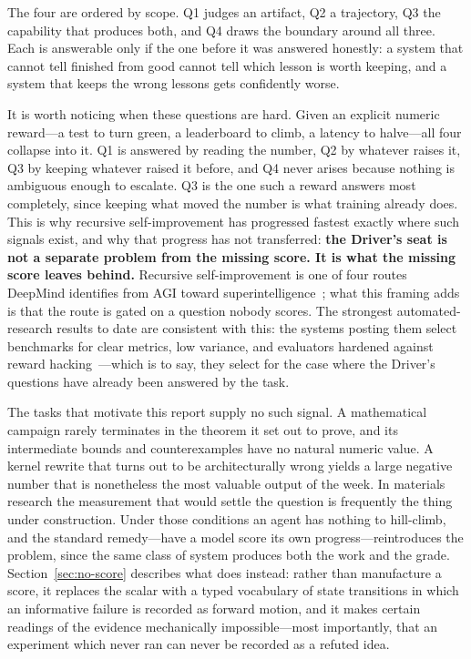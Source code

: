 The four are ordered by scope. Q1 judges an artifact, Q2 a trajectory, Q3 the
capability that produces both, and Q4 draws the boundary around all three. Each is
answerable only if the one before it was answered honestly: a system that cannot tell
finished from good cannot tell which lesson is worth keeping, and a system that keeps
the wrong lessons gets confidently worse.

It is worth noticing when these questions are hard. Given an explicit numeric
reward---a test to
turn green, a leaderboard to climb, a latency to halve---all four collapse into it.
Q1 is answered by reading the number, Q2 by whatever raises it, Q3 by keeping
whatever raised it before, and Q4 never arises because nothing is ambiguous enough to
escalate. Q3 is the one such a reward answers most completely, since keeping what
moved the number is what training already does. This is why recursive self-improvement has
progressed fastest exactly where such signals exist, and why that progress has not
transferred: \textbf{the Driver's seat is not a separate problem from the missing
score. It is what the missing score leaves behind.} Recursive self-improvement is one
of four routes DeepMind identifies from AGI toward
superintelligence~\citep{legg2026agitoasi}; what this framing adds is that the route
is gated on a question nobody scores. The strongest automated-research results to date
are consistent with this: the systems posting them select benchmarks for clear metrics,
low variance, and evaluators hardened against reward
hacking~\citep{recursive2026firststeps}---which is to say, they select for the case
where the Driver's questions have already been answered by the task.

The tasks that motivate this report supply no such signal. A mathematical campaign
rarely terminates in the theorem it set out to prove, and its intermediate bounds and
counterexamples have no natural numeric value. A kernel rewrite that turns out to be
architecturally wrong yields a large negative number that is nonetheless the most
valuable output of the week. In materials research the measurement that would settle
the question is frequently the thing under construction. Under those conditions an
agent has nothing to hill-climb, and the standard remedy---have a model score its own
progress---reintroduces the problem, since the same class of system produces both the
work and the grade. Section~\ref{sec:no-score} describes what \systemname{} does
instead: rather than manufacture a score, it replaces the scalar with a typed
vocabulary of state transitions in which an informative failure is recorded as
forward motion, and it makes certain readings of the evidence mechanically
impossible---most importantly, that an experiment which never ran can never be
recorded as a refuted idea.

